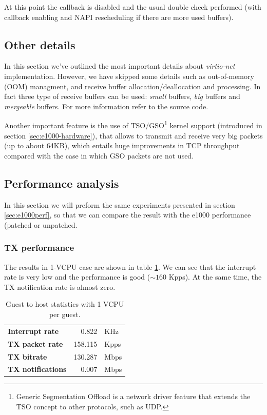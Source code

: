 At this point the callback is disabled and the usual double check performed (with callback enabling and NAPI rescheduling if there are
more used buffers).


\subsection{Other details}
In this section we've outlined the most important details about \emph{virtio-net} implementation. However, we have skipped some details
such as out-of-memory (OOM) managment, and receive buffer allocation/deallocation and processing.
In fact three type of receive buffers can be used: \emph{small} buffers, \emph{big} buffers and \emph{mergeable} buffers. For more
information refer to the source code.

\vspace{0.5cm}

Another important feature is the use of TSO/GSO\footnote{Generic Segmentation Offload is a network driver feature that extends the TSO
concept to other protocols, such as UDP.} kernel support (introduced in section \ref{sec:e1000-hardware}), that allows to transmit
and receive very big packets (up to about 64KB), which entails huge improvements in TCP throughput compared with the case in which
GSO packets are not used.


\subsection{Performance analysis}
In this section we will preform the same experiments presented in section \ref{sec:e1000perf}, so that we can compare the result with
the e1000 performance (patched or unpatched.

\subsubsection{TX performance}
\label{sec:virtionet-perf-tx}
The results in 1-VCPU case are shown in table \ref{tab:virtionet-tx-g2h1vcpu}. We can see that the interrupt rate is very low and the
performance is good ($\sim 160$ Kpps). At the same time, the TX notification rate is almost zero. 

\begin{table}
\begin{center}
\begin{tabular}{lrl}
\toprule
\textbf{Interrupt rate} & 0.822 & KHz\\
\textbf{TX packet rate} & 158.115 & Kpps\\
\textbf{TX bitrate} & 130.287 & Mbps\\
\textbf{TX notifications} & 0.007 & Mbps\\
\bottomrule
\end{tabular}
\end{center}
\caption{Guest to host statistics with 1 VCPU per guest.}
\label{tab:virtionet-tx-g2h1vcpu}
\end{table}

